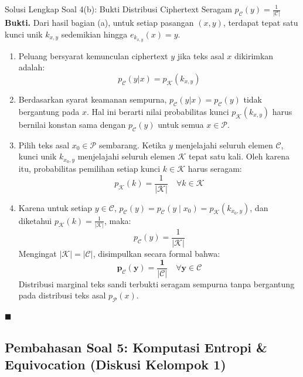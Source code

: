 \documentclass[11pt,a4paper]{article}
\newenvironment{proof}{\noindent\textbf{Bukti.}}{\hfill$\blacksquare$\vspace{0.3em}}
\begin{document}
\vspace{0.3cm}

\begin{solusibox}{Solusi Lengkap Soal 4(b): Bukti Distribusi Ciphertext Seragam $p_{\mathcal{C}}(y) = \frac{1}{|\mathcal{C}|}$}
\begin{proof}
Dari hasil bagian (a), untuk setiap pasangan $(x, y)$, terdapat tepat satu kunci unik $k_{x,y}$ sedemikian hingga $e_{k_{x,y}}(x) = y$.
\begin{enumerate}
    \item Peluang bersyarat kemunculan ciphertext $y$ jika teks asal $x$ dikirimkan adalah:
    \[
    p_{\mathcal{C}}(y|x) = p_{\mathcal{K}}(k_{x,y})
    \]
    \item Berdasarkan syarat keamanan sempurna, $p_{\mathcal{C}}(y|x) = p_{\mathcal{C}}(y)$ tidak bergantung pada $x$. Hal ini berarti nilai probabilitas kunci $p_{\mathcal{K}}(k_{x,y})$ harus bernilai konstan sama dengan $p_{\mathcal{C}}(y)$ untuk semua $x \in \mathcal{P}$.
    \item Pilih teks asal $x_0 \in \mathcal{P}$ sembarang. Ketika $y$ menjelajahi seluruh elemen $\mathcal{C}$, kunci unik $k_{x_0, y}$ menjelajahi seluruh elemen $\mathcal{K}$ tepat satu kali. Oleh karena itu, probabilitas pemilihan setiap kunci $k \in \mathcal{K}$ harus seragam:
    \[
    p_{\mathcal{K}}(k) = \frac{1}{|\mathcal{K}|} \quad \forall k \in \mathcal{K}
    \]
    \item Karena untuk setiap $y \in \mathcal{C}$, $p_{\mathcal{C}}(y) = p_{\mathcal{C}}(y \mid x_0) = p_{\mathcal{K}}(k_{x_0, y})$, dan diketahui $p_{\mathcal{K}}(k) = \frac{1}{|\mathcal{K}|}$, maka:
    \[
    p_{\mathcal{C}}(y) = \frac{1}{|\mathcal{K}|}
    \]
    Mengingat $|\mathcal{K}| = |\mathcal{C}|$, disimpulkan secara formal bahwa:
    \[
    \mathbf{p_{\mathcal{C}}(y) = \frac{1}{|\mathcal{C}|} \quad \forall y \in \mathcal{C}}
    \]
    Distribusi marginal teks sandi terbukti seragam sempurna tanpa bergantung pada distribusi teks asal $p_{\mathcal{P}}(x)$.
\end{enumerate}
\end{proof}
\end{solusibox}

\newpage

\subsection{Pembahasan Soal 5: Komputasi Entropi \& Equivocation (Diskusi Kelompok 1)}
\end{document}
